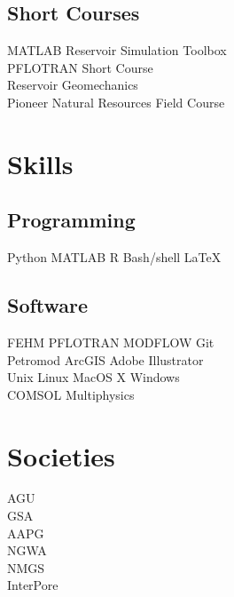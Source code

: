 \documentclass[]{deedy-resume-openfont}
\begin{document}
\begin{minipage}[t]{0.33\textwidth}
\subsection{Short Courses}
MATLAB Reservoir Simulation Toolbox \\
PFLOTRAN Short Course \\
Reservoir Geomechanics \\
Pioneer Natural Resources Field Course


\section{Skills}
\subsection{Programming}
Python 
\textbullet{} MATLAB 
\textbullet{} R 
\textbullet{} Bash/shell
\textbullet{} \LaTeX

\subsection{Software}
FEHM 
\textbullet{} PFLOTRAN 
\textbullet{} MODFLOW
\textbullet{} Git 
\\ Petromod
\textbullet{} ArcGIS 
\textbullet{} Adobe Illustrator
\\ Unix \textbullet{} Linux \textbullet{} MacOS X \textbullet{} Windows
\\ COMSOL Multiphysics


\section{Societies}
AGU\\
GSA\\
AAPG\\
NGWA\\
NMGS\\
InterPore
\sectionsep

%
%
\end{minipage}
\hfill
\end{document}
